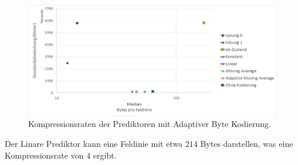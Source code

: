 \begin{figure}[!htbp]
	\center
	\includegraphics[width=1\textwidth,keepaspectratio]{./pictures/resultate/loesung2/variante0/resultate_byte.png}
	\caption{Kompressionsraten der Prediktoren mit Adaptiver Byte Kodierung.}
	\label{resultate:loesung2:simple:resultate_byte}
\end{figure}
Der Linare Prediktor kann eine Feldinie mit etwa $214$ Bytes darstellen, was eine Kompressionsrate von $4$ ergibt.

